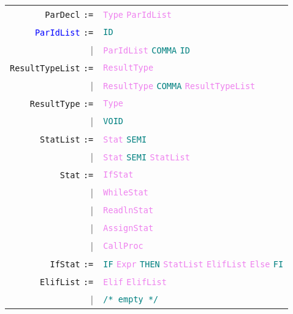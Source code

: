 \documentclass[a4paper,12pt]{article}
\newcommand\nonterm[1]{\texttt{\textcolor{violet}{#1}}}
\newcommand\term[1]{\texttt{\textcolor{teal}{#1}}}
\newcommand\production[1]{\texttt{#1} \texttt{:=}}
\newcommand\emptyprod{\texttt{\textcolor{teal}{/* empty */}}}
\begin{document}
\begin{tabular}{rl}
	\production{ParDecl}            & \nonterm{Type} \nonterm{ParIdList} \\
	\production{\textcolor{blue}{ParIdList}}           & \term{ID} \\
						  |& \nonterm{ParIdList} \term{COMMA} \term{ID} \\
	\production{ResultTypeList} & \nonterm{ResultType} \\
						  |& \nonterm{ResultType} \term{COMMA} \nonterm{ResultTypeList} \\
	\production{ResultType}       & \nonterm{Type} \\
						  |& \term{VOID} \\
	\production{StatList} 		   & \nonterm{Stat} \term{SEMI} \\
						  |& \nonterm{Stat} \term{SEMI} \nonterm{StatList} \\
	\production{Stat}                  & \nonterm{IfStat} \\
						  |& \nonterm{WhileStat} \\
						  |& \nonterm{ReadlnStat} \\
						  |& \nonterm{AssignStat} \\
						  |& \nonterm{CallProc} \\
    \production{IfStat}                   & \term{IF} \nonterm{Expr} \term{THEN} \nonterm{StatList} \nonterm{ElifList} \nonterm{Else} \term{FI} \\
    \production{ElifList}                 & \nonterm{Elif} \nonterm{ElifList} \\
    						|& \emptyprod \\
    \end{tabular}
\end{document}
